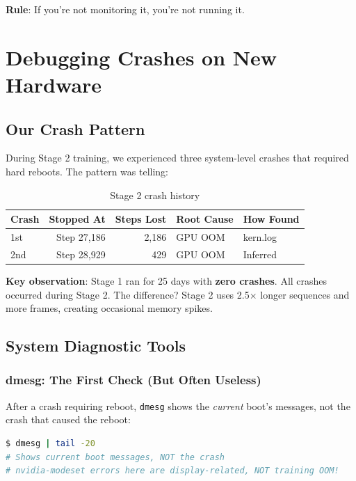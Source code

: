 \documentclass[11pt,a4paper]{article}
\begin{document}
\textbf{Rule}: If you're not monitoring it, you're not running it.

\section{Debugging Crashes on New Hardware}

\subsection{Our Crash Pattern}

During Stage 2 training, we experienced three system-level crashes that required hard reboots. The pattern was telling:

\begin{table}[H]
\centering
\begin{tabular}{@{}lrrll@{}}
\toprule
\textbf{Crash} & \textbf{Stopped At} & \textbf{Steps Lost} & \textbf{Root Cause} & \textbf{How Found} \\
\midrule
1st & Step 27,186 & 2,186 & GPU OOM & kern.log \\
2nd & Step 28,929 & 429 & GPU OOM & Inferred \\
\bottomrule
\end{tabular}
\caption{Stage 2 crash history}
\end{table}

\textbf{Key observation}: Stage 1 ran for 25 days with \textbf{zero crashes}. All crashes occurred during Stage 2. The difference? Stage 2 uses 2.5$\times$ longer sequences and more frames, creating occasional memory spikes.

\subsection{System Diagnostic Tools}

\subsubsection{dmesg: The First Check (But Often Useless)}

After a crash requiring reboot, \texttt{dmesg} shows the \textit{current} boot's messages, not the crash that caused the reboot:

\begin{lstlisting}[language=bash,caption=dmesg after reboot - only shows current boot]
$ dmesg | tail -20
# Shows current boot messages, NOT the crash
# nvidia-modeset errors here are display-related, NOT training OOM!
\end{lstlisting}
\end{document}
